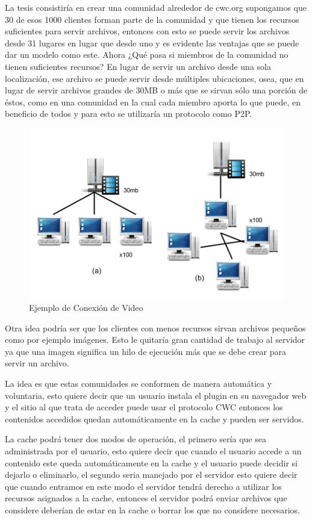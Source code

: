 La tesis consistiría en crear una comunidad alrededor de cwc.org supongamos que 30 de esos 1000 clientes forman parte de la comunidad y que tienen los recursos suficientes para servir archivos, entonces con esto se puede servir los archivos desde 31 lugares en lugar que desde uno y es evidente las ventajas que se puede dar un modelo como este. Ahora ¿Qué pasa si miembros de la comunidad no tienen suficientes recursos? En lugar de servir un archivo desde una sola localización, ese archivo se puede servir desde múltiples ubicaciones, osea, que en lugar de servir archivos grandes de 30MB o más que se sirvan sólo una porción de éstos, como en una comunidad en la cual cada miembro aporta lo que puede, en beneficio de todos y para esto se utilizaría un protocolo como P2P. 

\begin{figure}[h]
  \centering
    \includegraphics[scale=0.7]{gfx/conexion_video}
  \caption{Ejemplo de Conexión de Video}
  \label{conexionvideo}
\end{figure}

Otra idea podría ser que los clientes con menos recursos sirvan archivos pequeños como por ejemplo imágenes. Esto le quitaría gran cantidad de trabajo al servidor ya que una imagen significa un hilo de ejecución más que se debe crear para servir un archivo.

La idea es que estas comunidades se conformen de manera automática y voluntaria, esto quiere decir que un usuario instala el plugin en su navegador web y el sitio al que trata de acceder puede usar el protocolo CWC entonces los contenidos accedidos quedan automáticamente en la cache y pueden ser servidos.

La cache podrá tener dos modos de operación, el primero sería que sea administrada por el usuario, esto quiere decir que cuando el usuario accede a un contenido este queda automáticamente en la cache y el usuario puede decidir si dejarlo o eliminarlo, el segundo seria manejado por el servidor esto quiere decir que cuando entramos en este modo el servidor tendrá derecho a utilizar los recursos asignados a la cache, entonces el servidor podrá enviar archivos que considere deberían de estar en la cache o borrar los que no considere necesarios.

